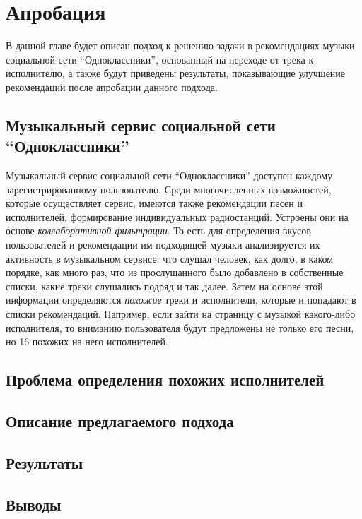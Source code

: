 \chapter{Апробация} 
\label{approbation}

В данной главе будет описан подход к решению задачи в рекомендациях музыки социальной сети ``Одноклассники'', основанный на переходе
от трека к исполнителю, а также будут приведены результаты, показывающие улучшение рекомендаций после апробации данного подхода.

\section{Музыкальный сервис социальной сети “Одноклассники”}

Музыкальный сервис социальной сети ``Одноклассники'' доступен каждому зарегистрированному пользователю. Среди многочисленных возможностей, 
которые осуществляет сервис, имеются также рекомендации песен и исполнителей, формирование индивидуальных радиостанций. Устроены они на 
основе \emph{коллаборативной фильтрации}. То есть для определения вкусов пользователей и рекомендации им подходящей музыки анализируется 
их активность в музыкальном сервисе: что слушал человек, как долго, в каком порядке, как много раз, что из прослушанного было добавлено 
в собственные списки, какие треки слушались подряд и так далее. Затем на основе этой информации определяются \emph{похожие} треки и исполнители,
которые и попадают в списки рекомендаций. Например, если зайти на страницу с музыкой какого-либо исполнителя, то вниманию пользователя будут 
предложены не только его песни, но 16 похожих на него исполнителей.


\section{Проблема определения похожих исполнителей}
\section{Описание предлагаемого подхода}
\section{Результаты}
\section{Выводы}
